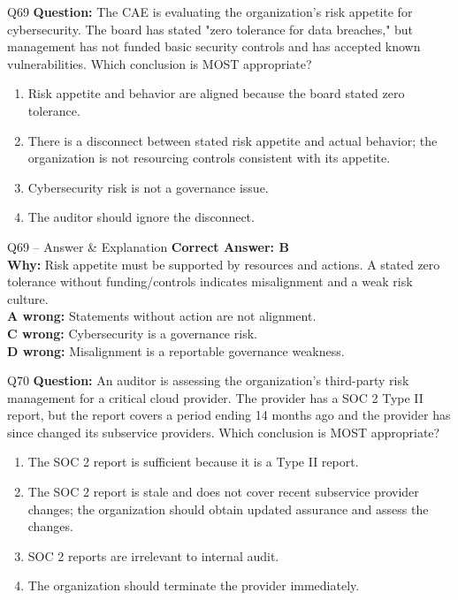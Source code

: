 \documentclass[aspectratio=169,10pt]{beamer}
\begin{document}
	\begin{frame}[t]{Q69}
		\small
		\textbf{Question:} The CAE is evaluating the organization's risk appetite for cybersecurity. The board has stated "zero tolerance for data breaches," but management has not funded basic security controls and has accepted known vulnerabilities. Which conclusion is MOST appropriate?
		\begin{enumerate}[label=\Alph*.,itemsep=1pt,topsep=2pt]
			\item Risk appetite and behavior are aligned because the board stated zero tolerance.
			\item There is a disconnect between stated risk appetite and actual behavior; the organization is not resourcing controls consistent with its appetite.
			\item Cybersecurity risk is not a governance issue.
			\item The auditor should ignore the disconnect.
		\end{enumerate}
	\end{frame}
	
	\begin{frame}[t]{Q69 -- Answer \& Explanation}
		\small
		\textbf{Correct Answer: B} \\[4pt]
		\textbf{Why:} Risk appetite must be supported by resources and actions. A stated zero tolerance without funding/controls indicates misalignment and a weak risk culture. \\[4pt]
		\textbf{A wrong:} Statements without action are not alignment. \\[2pt]
		\textbf{C wrong:} Cybersecurity is a governance risk. \\[2pt]
		\textbf{D wrong:} Misalignment is a reportable governance weakness.
	\end{frame}
	
	\begin{frame}[t]{Q70}
		\small
		\textbf{Question:} An auditor is assessing the organization's third-party risk management for a critical cloud provider. The provider has a SOC 2 Type II report, but the report covers a period ending 14 months ago and the provider has since changed its subservice providers. Which conclusion is MOST appropriate?
		\begin{enumerate}[label=\Alph*.,itemsep=1pt,topsep=2pt]
			\item The SOC 2 report is sufficient because it is a Type II report.
			\item The SOC 2 report is stale and does not cover recent subservice provider changes; the organization should obtain updated assurance and assess the changes.
			\item SOC 2 reports are irrelevant to internal audit.
			\item The organization should terminate the provider immediately.
		\end{enumerate}
	\end{frame}
	
\end{document}
